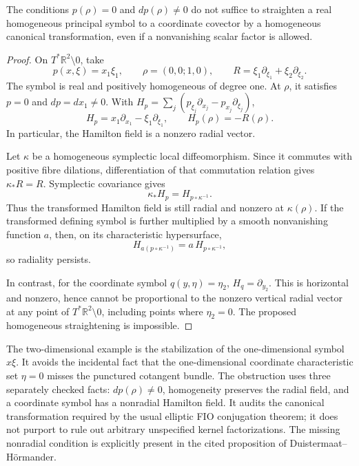 \begin{proposition}\leavevmode\par\noindent\ours\quad
The conditions \(p(\rho)=0\) and \(dp(\rho)\ne0\) do not suffice to
straighten a real homogeneous principal symbol to a coordinate covector
by a homogeneous canonical transformation, even if a nonvanishing
scalar factor is allowed.
\end{proposition}

\begin{proof}
On \(T^*\mathbb R^2\setminus0\), take
\[
 p(x,\xi)=x_1\xi_1,\qquad
 \rho=(0,0;1,0),\qquad
 R=\xi_1\partial_{\xi_1}+\xi_2\partial_{\xi_2}.
\]
The symbol is real and positively homogeneous of degree one.
At \(\rho\), it satisfies \(p=0\) and \(dp=dx_1\ne0\).
With
\(H_p=\sum_j(p_{\xi_j}\partial_{x_j}-p_{x_j}\partial_{\xi_j})\),
\[
 H_p=x_1\partial_{x_1}-\xi_1\partial_{\xi_1},
 \qquad H_p(\rho)=-R(\rho).
\]
In particular, the Hamilton field is a nonzero radial vector.

Let \(\kappa\) be a homogeneous symplectic local diffeomorphism. Since it
commutes with positive fibre dilations, differentiation of that
commutation relation gives \(\kappa_*R=R\). Symplectic covariance gives
\[
 \kappa_*H_p=H_{p\circ\kappa^{-1}}.
\]
Thus the transformed Hamilton field is still radial and nonzero at
\(\kappa(\rho)\). If the transformed defining symbol is further
multiplied by a smooth nonvanishing function \(a\), then, on its
characteristic hypersurface,
\[
 H_{a(p\circ\kappa^{-1})}
   =a\,H_{p\circ\kappa^{-1}},
\]
so radiality persists.

In contrast, for the coordinate symbol \(q(y,\eta)=\eta_2\),
\(H_q=\partial_{y_2}\). This is horizontal and nonzero, hence cannot
be proportional to the nonzero vertical radial vector at any
point of \(T^*\mathbb R^2\setminus0\), including points where
\(\eta_2=0\). The proposed homogeneous straightening is impossible.
\end{proof}

\begin{remark}
The two-dimensional example is the stabilization of the one-dimensional
symbol \(x\xi\). It avoids the incidental fact that the one-dimensional
coordinate characteristic set \(\eta=0\) misses the punctured cotangent
bundle. The obstruction uses three separately checked facts:
\(dp(\rho)\ne0\), homogeneity preserves the radial field, and a coordinate
symbol has a nonradial Hamilton field. It audits the canonical
transformation required by the usual elliptic FIO conjugation theorem;
it does not purport to rule out arbitrary unspecified kernel
factorizations. The missing nonradial condition is explicitly present
in the cited proposition of Duistermaat--Hörmander.
\end{remark}

